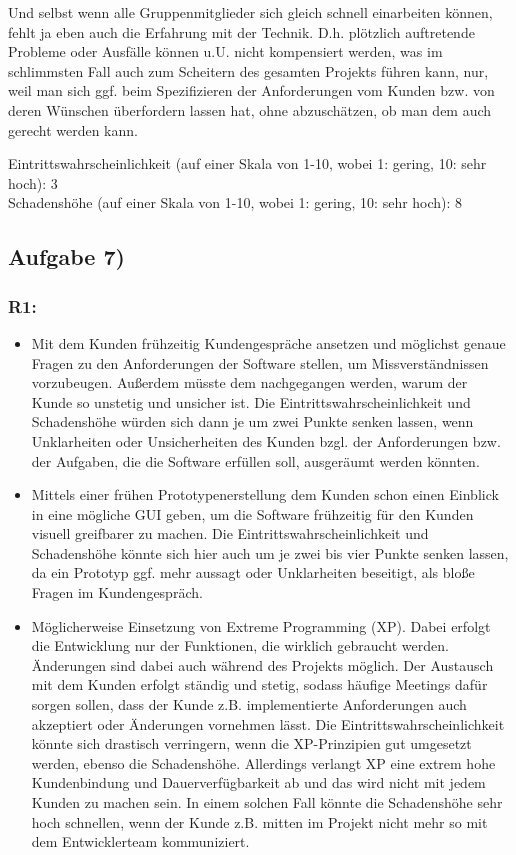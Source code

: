 \documentclass{swp1}
\begin{document}
Und selbst wenn alle Gruppenmitglieder sich gleich schnell einarbeiten können, fehlt ja eben auch die Erfahrung mit der Technik. D.h. plötzlich auftretende Probleme oder Ausfälle können u.U. nicht kompensiert werden, was im schlimmsten Fall auch zum Scheitern des gesamten Projekts führen kann, nur, weil man sich ggf. beim Spezifizieren der Anforderungen vom Kunden bzw. von deren Wünschen überfordern lassen hat, ohne abzuschätzen, ob man dem auch gerecht werden kann.

Eintrittswahrscheinlichkeit (auf einer Skala von 1-10, wobei 1: gering, 10: sehr hoch): 3 \\
Schadenshöhe (auf einer Skala von 1-10, wobei 1: gering, 10: sehr hoch): 8

\subsection*{Aufgabe 7)}
\subsubsection*{R1:}
\begin{itemize}
\item Mit dem Kunden frühzeitig Kundengespräche ansetzen und möglichst genaue Fragen zu den Anforderungen der Software stellen, um Missverständnissen vorzubeugen. Außerdem müsste dem nachgegangen werden, warum der Kunde so unstetig und unsicher ist. Die Eintrittswahrscheinlichkeit und Schadenshöhe würden sich dann je um zwei Punkte senken lassen, wenn Unklarheiten oder Unsicherheiten des Kunden bzgl. der Anforderungen bzw. der Aufgaben, die die Software erfüllen soll, ausgeräumt werden könnten.
\item Mittels einer frühen Prototypenerstellung dem Kunden schon einen Einblick in eine mögliche GUI geben, um die Software frühzeitig für den Kunden visuell greifbarer zu machen. Die Eintrittswahrscheinlichkeit und Schadenshöhe könnte sich hier auch um je zwei bis vier Punkte senken lassen, da ein Prototyp ggf. mehr aussagt oder Unklarheiten beseitigt, als bloße Fragen im Kundengespräch.
\item Möglicherweise Einsetzung von Extreme Programming (XP). Dabei erfolgt die Entwicklung nur der Funktionen, die wirklich gebraucht werden. Änderungen sind dabei auch während des Projekts möglich. Der Austausch mit dem Kunden erfolgt ständig und stetig, sodass häufige Meetings dafür sorgen sollen, dass der Kunde z.B. implementierte Anforderungen auch akzeptiert oder Änderungen vornehmen lässt. Die Eintrittswahrscheinlichkeit könnte sich drastisch verringern, wenn die XP-Prinzipien gut umgesetzt werden, ebenso die Schadenshöhe. Allerdings verlangt XP eine extrem hohe Kundenbindung und Dauerverfügbarkeit ab und das wird nicht mit jedem Kunden zu machen sein. In einem solchen Fall könnte die Schadenshöhe sehr hoch schnellen, wenn der Kunde z.B. mitten im Projekt nicht mehr so mit dem Entwicklerteam kommuniziert.

\end{itemize}
\end{document}
